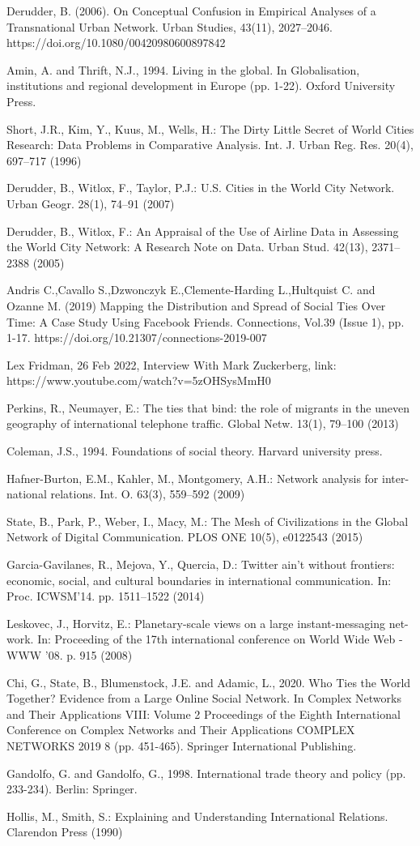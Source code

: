 \documentclass[12pt]{article}
\begin{document}
Derudder, B. (2006). On Conceptual Confusion in Empirical Analyses of a Transnational Urban Network. Urban Studies, 43(11), 2027–2046. https://doi.org/10.1080/00420980600897842

Amin, A. and Thrift, N.J., 1994. Living in the global. In Globalisation, institutions and regional development in Europe (pp. 1-22). Oxford University Press.

Short, J.R., Kim, Y., Kuus, M., Wells, H.: The Dirty Little Secret of World Cities
Research: Data Problems in Comparative Analysis. Int. J. Urban Reg. Res. 20(4),
697–717 (1996)

Derudder, B., Witlox, F., Taylor, P.J.: U.S. Cities in the World City Network.
Urban Geogr. 28(1), 74–91 (2007)

Derudder, B., Witlox, F.: An Appraisal of the Use of Airline Data in Assessing the
World City Network: A Research Note on Data. Urban Stud. 42(13), 2371–2388
(2005)

Andris C.,Cavallo S.,Dzwonczyk E.,Clemente-Harding L.,Hultquist C. and Ozanne M. (2019) Mapping the Distribution and Spread of Social Ties Over Time: A Case Study Using Facebook Friends. Connections, Vol.39 (Issue 1), pp. 1-17. https://doi.org/10.21307/connections-2019-007

Lex Fridman, 26 Feb 2022, Interview With Mark Zuckerberg, link: https://www.youtube.com/watch?v=5zOHSysMmH0

Perkins, R., Neumayer, E.: The ties that bind: the role of migrants in the uneven
geography of international telephone traffic. Global Netw. 13(1), 79–100 (2013)

Coleman, J.S., 1994. Foundations of social theory. Harvard university press.

Hafner-Burton, E.M., Kahler, M., Montgomery, A.H.: Network analysis for inter-
national relations. Int. O. 63(3), 559–592 (2009)

State, B., Park, P., Weber, I., Macy, M.: The Mesh of Civilizations in the Global
Network of Digital Communication. PLOS ONE 10(5), e0122543 (2015)

Garcia-Gavilanes, R., Mejova, Y., Quercia, D.: Twitter ain’t without frontiers:
economic, social, and cultural boundaries in international communication. In: Proc.
ICWSM’14. pp. 1511–1522 (2014)

Leskovec, J., Horvitz, E.: Planetary-scale views on a large instant-messaging net-
work. In: Proceeding of the 17th international conference on World Wide Web -
WWW ’08. p. 915 (2008)

Chi, G., State, B., Blumenstock, J.E. and Adamic, L., 2020. Who Ties the World Together? Evidence from a Large Online Social Network. In Complex Networks and Their Applications VIII: Volume 2 Proceedings of the Eighth International Conference on Complex Networks and Their Applications COMPLEX NETWORKS 2019 8 (pp. 451-465). Springer International Publishing.

Gandolfo, G. and Gandolfo, G., 1998. International trade theory and policy (pp. 233-234). Berlin: Springer.

Hollis, M., Smith, S.: Explaining and Understanding International Relations.
Clarendon Press (1990)
\end{document}

